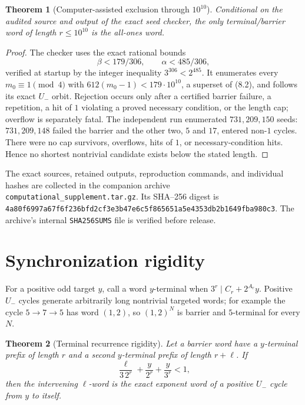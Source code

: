 \documentclass[11pt,reqno]{amsart}
\newtheorem{theorem}{Theorem}[section]
\theoremstyle{remark}
\newcommand{\Um}{U_{-}}
\begin{document}
\begin{theorem}[Computer-assisted exclusion through $10^{10}$]
Conditional on the audited source and output of the exact seed checker, the
only terminal/barrier word of length $r\le10^{10}$ is the all-ones word.
\end{theorem}

\begin{proof}
The checker uses the exact rational bounds
\[
 \beta<179/306,\qquad \alpha<485/306,
\]
verified at startup by the integer inequality $3^{306}<2^{485}$.  It
enumerates every $m_0\equiv1\pmod4$ with
$612(m_0-1)<179\cdot10^{10}$, a superset of (8.2), and follows its exact
$\Um$ orbit.  Rejection occurs only after a certified barrier failure, a
repetition, a hit of $1$ violating a proved necessary condition, or the
length cap; overflow is separately fatal.  The independent run enumerated
$731{,}209{,}150$ seeds: $731{,}209{,}148$ failed the barrier and the other
two, $5$ and $17$, entered non-$1$ cycles.  There were no cap survivors,
overflows, hits of $1$, or necessary-condition hits.  Hence no shortest
nontrivial candidate exists below the stated length.
\end{proof}

The exact sources, retained outputs, reproduction commands, and individual
hashes are collected in the companion archive
\texttt{computational\_supplement.tar.gz}.  Its SHA--256 digest is
\nolinkurl{4a80f6997a67f6f236bfd2cf3e3b47e6c5f865651a5e4353db2b1649fba980c3}.
The archive's internal \texttt{SHA256SUMS} file is verified before release.

\section{Synchronization rigidity}

For a positive odd target $y$, call a word $y$-terminal when
$3^r\mid C_r+2^{A_r}y$.  Positive $\Um$ cycles generate arbitrarily long
nontrivial targeted words; for example the cycle $5\to7\to5$ has word
$(1,2)$, so $(1,2)^N$ is barrier and $5$-terminal for every $N$.

\begin{theorem}[Terminal recurrence rigidity]\label{thm:rigidity}
Let a barrier word have a $y$-terminal prefix of length $r$ and a second
$y$-terminal prefix of length $r+\ell$.  If
\[
 \frac{\ell}{3\,2^r}+\frac{y}{2^r}+\frac{y}{3^r}<1,  \tag{9.1}
\]
then the intervening $\ell$-word is the exact exponent word of a positive
$\Um$ cycle from $y$ to itself.
\end{theorem}
\end{document}
